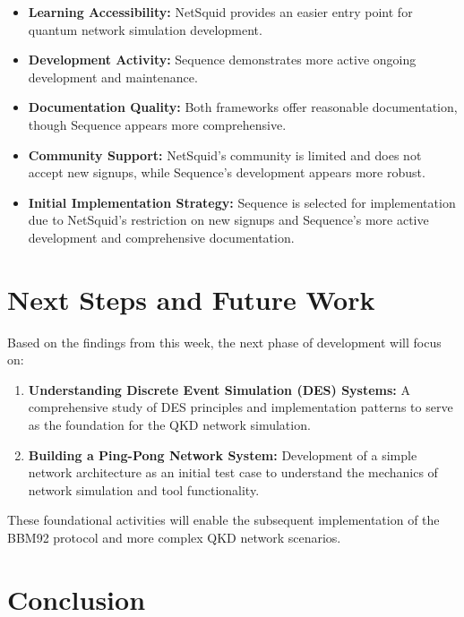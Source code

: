 \begin{itemize}
    \item \textbf{Learning Accessibility:} NetSquid \cite{NetSquidTutorial} provides an easier entry point for quantum network simulation development.
    \item \textbf{Development Activity:} Sequence \cite{SequenceTutorial} demonstrates more active ongoing development and maintenance.
    \item \textbf{Documentation Quality:} Both frameworks offer reasonable documentation, though Sequence appears more comprehensive.
    \item \textbf{Community Support:} NetSquid's community is limited and does not accept new signups, while Sequence's development appears more robust.
    \item \textbf{Initial Implementation Strategy:} Sequence \cite{SequenceTutorial} is selected for implementation due to NetSquid's restriction on new signups and Sequence's more active development and comprehensive documentation.
\end{itemize}

\section{Next Steps and Future Work}

Based on the findings from this week, the next phase of development will focus on:

\begin{enumerate}
    \item \textbf{Understanding Discrete Event Simulation (DES) Systems:} A comprehensive study of DES principles and implementation patterns to serve as the foundation for the QKD network simulation.
    \item \textbf{Building a Ping-Pong Network System:} Development of a simple network architecture as an initial test case to understand the mechanics of network simulation and tool functionality.
\end{enumerate}

These foundational activities will enable the subsequent implementation of the BBM92 \cite{BBM92Paper} protocol and more complex QKD network scenarios.

\section{Conclusion}

